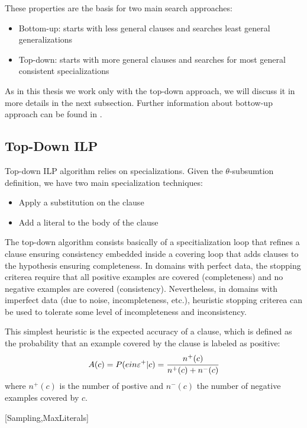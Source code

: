 These properties are the basis for two main search approaches:

\begin{itemize}
 \item Bottom-up: starts with less general clauses and searches least general generalizations
 \item Top-down: starts with more general clauses and searches for most general consistent specializations
\end{itemize}

As in this thesis we work only with the top-down approach, we will discuss it in more details in the next subsection.
Further information about bottow-up approach can be found in \cite{DBLP:journals/ml/LavracD96}.

\subsection{Top-Down ILP}

Top-down ILP algorithm relies on specializations. Given the $\theta$-subsumtion definition, we have two main
specialization techniques:

\begin{itemize}
 \item Apply a substitution on the clause
 \item Add a literal to the body of the clause
\end{itemize}

The top-down algorithm consists basically of a specitialization loop that refines a clause ensuring consistency
embedded inside a covering loop that adds clauses to the hypothesis ensuring completeness. In domains with perfect data,
the stopping criterea require that all positive examples are covered (completeness) and no negative examples are
covered (consistency). Nevertheless, in domains with imperfect data (due to noise, incompleteness, etc.), heuristic
stopping criterea can be used to tolerate some level of incompleteness and inconsistency.

This simplest heuristic is the expected accuracy of a clause, which is defined as the probability that an example
covered by the clause is labeled as positive:
\begin{equation}
A(c)=P(e in \varepsilon^{+}|c)=\cfrac{n^{+}(c)}{n^{+}(c)+n^{-}(c)} 
\end{equation}
where $n^{+}(c)$ is the number of postive and $n^{-}(c)$ the number of negative examples covered by $c$. 

[Sampling,MaxLiterals]


